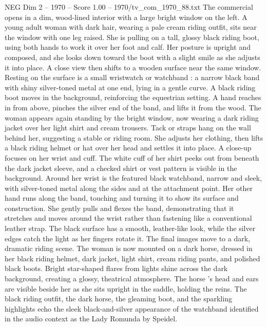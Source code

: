 \begin{textsample}{NEG Dim 2 – 1970 – Score 1.00 – 1970/tv\_com\_1970\_88.txt}  \label{ex:f2_neg_024}
The commercial opens in a dim, wood-lined interior with a large bright window on the left.
A young adult woman with dark hair, wearing a pale cream riding outfit, sits near the window with one leg raised.
She is pulling on a tall, glossy black riding boot, using both hands to work it over her foot and calf.
Her posture is upright and composed, and she looks down toward the boot with a slight smile as she adjusts it into place.
A close view then shifts to a wooden surface near the same window.
Resting on the surface is a small wristwatch or watchband : a narrow black band with shiny silver-toned metal at one end, lying in a gentle curve.
A black riding boot moves in the background, reinforcing the equestrian setting.
A hand reaches in from above, pinches the silver end of the band, and lifts it from the wood.
The woman appears again standing by the bright window, now wearing a dark riding jacket over her light shirt and cream trousers.
Tack or straps hang on the wall behind her, suggesting a stable or riding room.
She adjusts her clothing, then lifts a black riding helmet or hat over her head and settles it into place.
A close-up focuses on her wrist and cuff.
The white cuff of her shirt peeks out from beneath the dark jacket sleeve, and a checked shirt or vest pattern is visible in the background.
Around her wrist is the featured black watchband, narrow and sleek, with silver-toned metal along the sides and at the attachment point.
Her other hand runs along the band, touching and turning it to show its surface and construction.
She gently pulls and flexes the band, demonstrating that it stretches and moves around the wrist rather than fastening like a conventional leather strap.
The black surface has a smooth, leather-like look, while the silver edges catch the light as her fingers rotate it.
The final images move to a dark, dramatic riding scene.
The woman is now mounted on a dark horse, dressed in her black riding helmet, dark jacket, light shirt, cream riding pants, and polished black boots.
Bright star-shaped flares from lights shine across the dark background, creating a glossy, theatrical atmosphere.
The horse ’s head and ears are visible beside her as she sits upright in the saddle, holding the reins.
The black riding outfit, the dark horse, the gleaming boot, and the sparkling highlights echo the sleek black-and-silver appearance of the watchband identified in the audio context as the Lady Romunda by Speidel.

\end{textsample}
